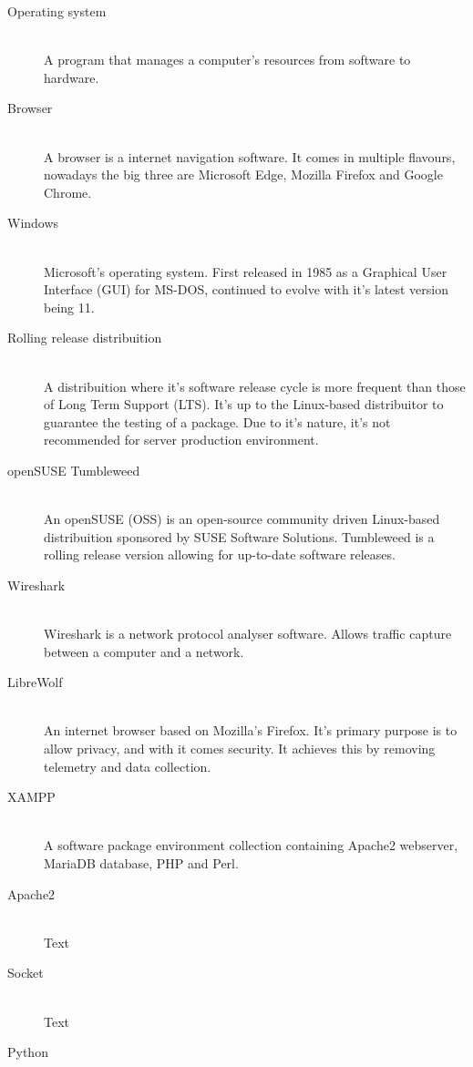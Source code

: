\documentclass[11pt,a4paper]{report}
\begin{document}
\begin{description}
    \item[Operating system] \hfill \\
        A program that manages a computer's resources from software to hardware.
    \item[Browser] \hfill \\
        A browser is a internet navigation software. It comes in multiple flavours, nowadays the big three are Microsoft Edge, Mozilla Firefox and Google Chrome.
    \item[Windows] \hfill \\
        Microsoft's operating system. First released in 1985 as a Graphical User Interface (GUI) for MS-DOS, continued to evolve with it's latest version being 11.
    \item[Rolling release distribuition] \hfill \\
        A distribuition where it's software release cycle is more frequent than those of Long Term Support (LTS). It's up to the Linux-based distribuitor to guarantee the testing of a package.
        Due to it's nature, it's not recommended for server production environment.
    \item[openSUSE Tumbleweed] \hfill \\
        An openSUSE (OSS) is an open-source community driven Linux-based distribuition sponsored by SUSE Software Solutions. Tumbleweed is a rolling release version allowing for up-to-date software releases.
    \item[Wireshark] \hfill \\
        Wireshark is a network protocol analyser software. Allows traffic capture between a computer and a network.
    \item[LibreWolf] \hfill \\
        An internet browser based on Mozilla's Firefox. It's primary purpose is to allow privacy, and with it comes security. It achieves this by removing telemetry and data collection.
    \item[XAMPP] \hfill \\
        A software package environment collection containing Apache2 webserver, MariaDB database, PHP and Perl.
    \item[Apache2] \hfill \\
        Text
    \item[Socket] \hfill \\
        Text
    \item[Python] \hfill \\

\end{description}
\end{document}
